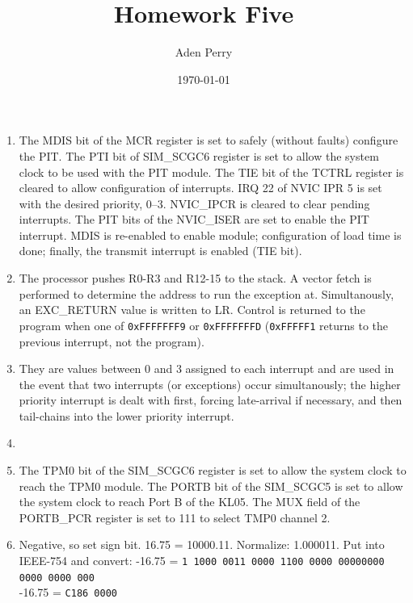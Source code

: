 \documentclass{article}
\title{Homework Five}
\author{Aden Perry}
\date{\today}
\begin{document}
\maketitle

\begin{enumerate}
	\item The MDIS bit of the MCR register is set to safely (without faults)
	      configure the PIT. The PTI bit of SIM\_SCGC6 register is set to allow
	      the system clock to be used with the PIT module. The TIE bit of the
	      TCTRL register is cleared to allow configuration of interrupts. IRQ
	      22 of NVIC IPR 5 is set with the desired priority, 0--3. NVIC\_IPCR
	      is cleared to clear pending interrupts. The PIT bits of the
	      NVIC\_ISER are set to enable the PIT interrupt. MDIS is re-enabled to
	      enable module; configuration of load time is done; finally, the
	      transmit interrupt is enabled (TIE bit).

	\item The processor pushes R0-R3 and R12-15 to the stack. A vector fetch is
	      performed to determine the address to run the exception at.
	      Simultanously, an EXC\_RETURN value is written to LR. Control is
	      returned to the program when one of \texttt{0xFFFFFFF9} or
	      \texttt{0xFFFFFFFD} (\texttt{0xFFFFF1} returns to the previous
	      interrupt, not the program).

	\item They are values between 0 and 3 assigned to each interrupt and are
	      used in the event that two interrupts (or exceptions) occur
	      simultanously; the higher priority interrupt is dealt with first,
	      forcing late-arrival if necessary, and then tail-chains into the
	      lower priority interrupt.

	\item \inputminted{asm}{q4.s}

	\item The TPM0 bit of the SIM\_SCGC6 register is set to allow the system
	      clock to reach the TPM0 module. The PORTB bit of the SIM\_SCGC5 is
	      set to allow the system clock to reach Port B of the KL05. The MUX
	      field of the PORTB\_PCR register is set to 111 to select TMP0 channel
	      2.

	\item Negative, so set sign bit. 16.75 = 10000.11. Normalize: 1.000011. Put
	      into IEEE-754 and convert:
	      -16.75 = \texttt{1  1000 0011  0000 1100 0000 00000000 0000 0000 000} \\
	      -16.75 = \texttt{C186 0000}


\end{enumerate}
\end{document}
